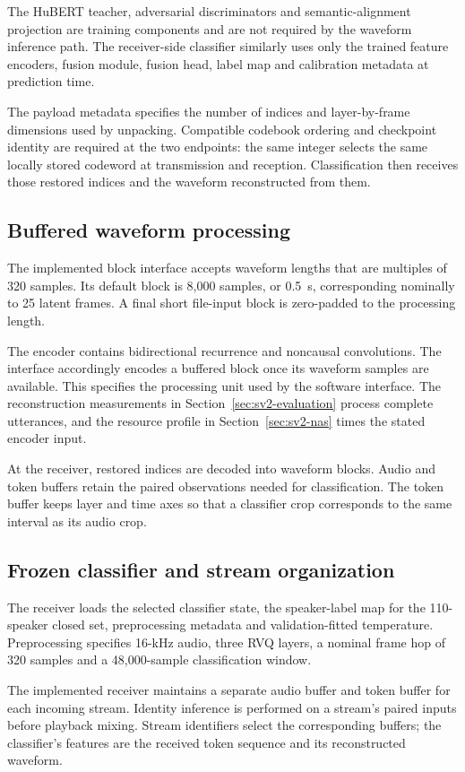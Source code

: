 The HuBERT teacher, adversarial discriminators and semantic-alignment projection are training components and are not required by the waveform inference path. The receiver-side classifier similarly uses only the trained feature encoders, fusion module, fusion head, label map and calibration metadata at prediction time.

The payload metadata specifies the number of indices and layer-by-frame dimensions used by unpacking. Compatible codebook ordering and checkpoint identity are required at the two endpoints: the same integer selects the same locally stored codeword at transmission and reception. Classification then receives those restored indices and the waveform reconstructed from them.

\subsection{Buffered waveform processing}
The implemented block interface accepts waveform lengths that are multiples of 320 samples. Its default block is 8,000 samples, or 0.5~s, corresponding nominally to 25 latent frames. A final short file-input block is zero-padded to the processing length.

The encoder contains bidirectional recurrence and noncausal convolutions. The interface accordingly encodes a buffered block once its waveform samples are available. This specifies the processing unit used by the software interface. The reconstruction measurements in Section~\ref{sec:sv2-evaluation} process complete utterances, and the resource profile in Section~\ref{sec:sv2-nas} times the stated encoder input.

At the receiver, restored indices are decoded into waveform blocks. Audio and token buffers retain the paired observations needed for classification. The token buffer keeps layer and time axes so that a classifier crop corresponds to the same interval as its audio crop.

\subsection{Frozen classifier and stream organization}
The receiver loads the selected classifier state, the speaker-label map for the 110-speaker closed set, preprocessing metadata and validation-fitted temperature. Preprocessing specifies 16-kHz audio, three RVQ layers, a nominal frame hop of 320 samples and a 48,000-sample classification window.

The implemented receiver maintains a separate audio buffer and token buffer for each incoming stream. Identity inference is performed on a stream's paired inputs before playback mixing. Stream identifiers select the corresponding buffers; the classifier's features are the received token sequence and its reconstructed waveform.

